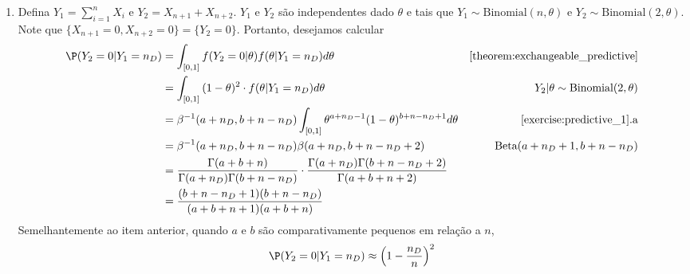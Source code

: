 {\begin{enumerate}[label=(\alph*)]
\begin{align*}
   &= \beta^{-1}(a+n_{D},b+n-n_{D})
   \beta(a+n_{D}+1,n+n-n_{D})
   & \text{Beta}(a+n_{D}+1,b+n-n_{D}) \\
   &= \frac{\Gamma(a+b+n)}
   {\Gamma(a+n_{D})\Gamma(b+n-n_{D})}
   \cdot \frac{\Gamma(a+n_{D}+1)\Gamma(b+n-n_{D})}
   {\Gamma(a+b+n+1)} \\
   &= \frac{a+n_{D}}{a+b+n} 
   = \frac{a+b}{a+b+n} \cdot
   \frac{a}{a+b}+\left(1-\frac{a}{a+b+n}\right)
   \frac{n_{D}}{n}
  \end{align*}
  Note que $\frac{a+b}{a+b+n} \cdot \frac{a}{a+b} + \left(1-\frac{a}{a+b+n}\right)\frac{n_{D}}{n}$
  é uma média ponderada entre $\frac{a}{a+b}$,
  a média a priori para $\theta$, e
  $\frac{n_{D}}{n}$ a proporção amostral de indivíduos com
  a intenção de votar em $D$.
  Também, se $a$ e $b$ forem 
  relativamente pequenos em relação a $n$, então
  $\P(Y_{2}=1|Y_{1}=n_{D}) \approx \frac{n_{D}}{n}$,
  que é a proporção amostral de indivíduos que
  tem a intenção de votar em $D$.
	
  \item Defina $Y_{1} = \sum_{i=1}^{n}{X_{i}}$ e
  $Y_{2}=X_{n+1}+X_{n+2}$. $Y_{1}$ e $Y_{2}$ são
  independentes dado $\theta$ e tais que
  $Y_{1} \sim \text{Binomial}(n,\theta)$ e
  $Y_{2} \sim \text{Binomial}(2, \theta)$.
  Note que $\{X_{n+1}=0,X_{n+2}=0\}=\{Y_{2}=0\}$.
  Portanto, desejamos calcular
  \begin{align*}
   \P(Y_{2}=0|Y_{1}=n_{D})
   &= \int_{[0,1]}
   {f(Y_{2}=0|\theta)f(\theta|Y_{1}=n_{D}) d\theta}
   & \text{\cref{theorem:exchangeable_predictive}} \\
   &= \int_{[0,1]}
   {(1-\theta)^{2} \cdot f(\theta|Y_{1}=n_{D}) d\theta}
   & Y_{2}|\theta \sim \text{Binomial}(2, \theta) \\
   &= \beta^{-1}(a+n_{D},b+n-n_{D})
   \int_{[0,1]}
   {\theta^{a+n_{D}-1} (1-\theta)^{b+n-n_{D}+1} d\theta}
   & \text{\cref{exercise:predictive_1}.a} \\
   &= \beta^{-1}(a+n_{D},b+n-n_{D})
   \beta(a+n_{D},b+n-n_{D}+2)
   & \text{Beta}(a+n_{D}+1,b+n-n_{D}) \\
   &= \frac{\Gamma(a+b+n)}
   {\Gamma(a+n_{D})\Gamma(b+n-n_{D})}
   \cdot \frac{\Gamma(a+n_{D})\Gamma(b+n-n_{D}+2)}
   {\Gamma(a+b+n+2)} \\
   &= \frac{(b+n-n_{D}+1)(b+n-n_{D})}{(a+b+n+1)(a+b+n)}
  \end{align*}
  Semelhantemente ao item anterior,
  quando $a$ e $b$ são comparativamente pequenos em 
  relação a $n$,
  \begin{align*}
   \P(Y_{2}=0|Y_{1}=n_{D})
   \approx \left(1-\frac{n_{D}}{n}\right)^{2}
  \end{align*}
 \end{enumerate}
}{}

